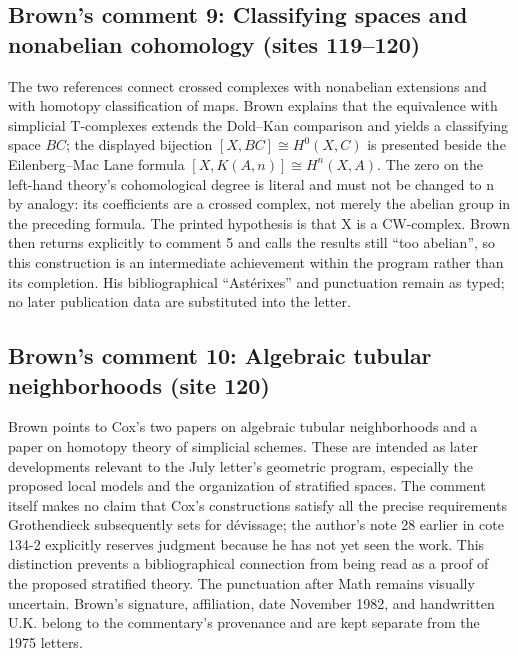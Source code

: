 \subsection*{Brown's comment 9: Classifying spaces and nonabelian cohomology (sites 119--120)}
The two references connect crossed complexes with nonabelian extensions and with homotopy classification of maps. Brown explains that the equivalence with simplicial T-complexes extends the Dold--Kan comparison and yields a classifying space $BC$; the displayed bijection $[X,BC]\cong H^0(X,C)$ is presented beside the Eilenberg--Mac Lane formula $[X,K(A,n)]\cong H^n(X,A)$. The zero on the left-hand theory's cohomological degree is literal and must not be changed to n by analogy: its coefficients are a crossed complex, not merely the abelian group in the preceding formula. The printed hypothesis is that X is a CW-complex. Brown then returns explicitly to comment 5 and calls the results still ``too abelian'', so this construction is an intermediate achievement within the program rather than its completion. His bibliographical ``Astérixes'' and punctuation remain as typed; no later publication data are substituted into the letter.

\subsection*{Brown's comment 10: Algebraic tubular neighborhoods (site 120)}
Brown points to Cox's two papers on algebraic tubular neighborhoods and a paper on homotopy theory of simplicial schemes. These are intended as later developments relevant to the July letter's geometric program, especially the proposed local models and the organization of stratified spaces. The comment itself makes no claim that Cox's constructions satisfy all the precise requirements Grothendieck subsequently sets for dévissage; the author's note 28 earlier in cote 134-2 explicitly reserves judgment because he has not yet seen the work. This distinction prevents a bibliographical connection from being read as a proof of the proposed stratified theory. The punctuation after Math remains visually uncertain. Brown's signature, affiliation, date November 1982, and handwritten U.K. belong to the commentary's provenance and are kept separate from the 1975 letters.


